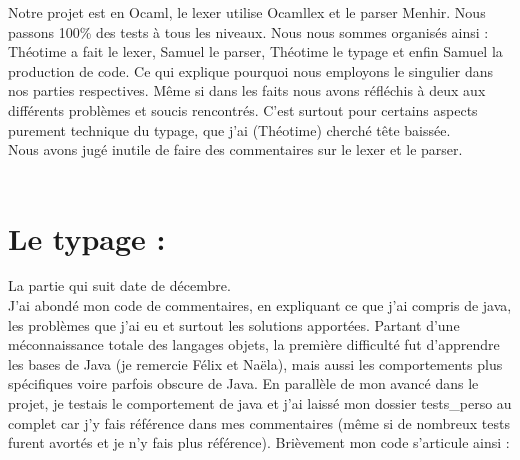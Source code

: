 \documentclass[12pt,a4paper]{report}
\begin{document}
Notre projet est en Ocaml, le lexer utilise Ocamllex et le parser Menhir. Nous passons 100\% des tests à tous les niveaux. Nous nous sommes organisés ainsi : Théotime a fait le lexer, Samuel le parser, Théotime le typage et enfin Samuel la production de code. Ce qui explique pourquoi nous employons le singulier dans nos parties respectives. Même si dans les faits nous avons réfléchis à deux aux différents problèmes et soucis rencontrés. C'est surtout pour certains aspects purement technique du typage, que j'ai (Théotime) cherché tête baissée. \\
Nous avons jugé inutile de faire des commentaires sur le lexer et le parser. \\ \\

\section{Le typage :}
La partie qui suit date de décembre. \\
J'ai abondé mon code de commentaires, en expliquant ce que j'ai compris de java, les problèmes que j'ai eu et surtout les solutions apportées. Partant d'une méconnaissance totale des langages objets, la première difficulté fut d'apprendre les bases de Java (je remercie Félix et Naëla), mais aussi les comportements plus spécifiques voire parfois obscure de Java. En parallèle de mon avancé dans le projet, je testais le comportement de java et j'ai laissé mon dossier tests\_perso au complet car j'y fais référence dans mes commentaires (même si de nombreux tests furent avortés et je n'y fais plus référence). Brièvement mon code s'articule ainsi :
\end{document}

